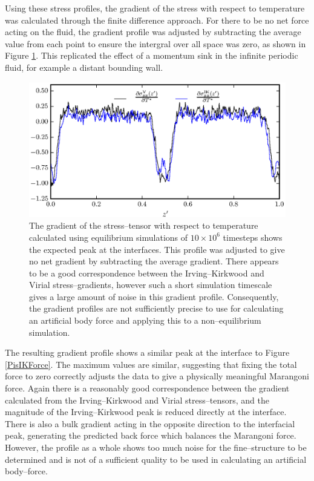\FloatBarrier
Using these stress profiles, the gradient of the stress with respect to temperature was calculated through the finite difference approach.
For there to be no net force acting on the fluid, the gradient profile was adjusted by subtracting the average value from each point to ensure the intergral over all space was zero, as shown in Figure \ref{Period10Force}.
This replicated the effect of a momentum sink in the infinite periodic fluid, for example a distant bounding wall.

\begin{figure}[h]
\centering
\includegraphics[scale=0.8]{Period10Force}
\caption{The gradient of the stress--tensor with respect to temperature calculated using equilibrium simulations of $10 \times 10^{6}$ timesteps shows the expected peak at the interfaces. 
This profile was adjusted to give no net gradient by subtracting the average gradient.
There appears to be a good correspondence between the Irving--Kirkwood and Virial stress--gradients, however such a short simulation timescale gives a large amount of noise in this gradient profile.
Consequently, the gradient profiles are not sufficiently precise to use for calculating an artificial body force and applying this to a non--equilibrium simulation.
}
\label{Period10Force}
\end{figure}
The resulting gradient profile shows a similar peak at the interface to Figure \ref{PisIKForce}. 
The maximum values are similar, suggesting that fixing the total force to zero correctly adjusts the data to give a physically meaningful Marangoni force.
Again there is a reasonably good correspondence between the gradient calculated from the Irving--Kirkwood and Virial stress--tensors, and the magnitude of the Irving--Kirkwood peak is reduced directly at the interface.
There is also a bulk gradient acting in the opposite direction to the interfacial peak, generating the predicted back force which balances the Marangoni force.
However, the profile as a whole shows too much noise for the fine--structure to be determined and is not of a sufficient quality to be used in calculating an artificial body--force.

